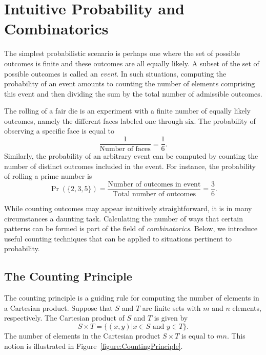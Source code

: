 \chapter{Intuitive Probability and Combinatorics}

The simplest probabilistic scenario is perhaps one where the set of possible outcomes is finite and these outcomes are all equally likely.
A subset of the set of possible outcomes is called an \emph{event}.
In such situations, computing the probability of an event amounts to counting the number of elements comprising this event and then dividing the sum by the total number of admissible outcomes.

\begin{example}
The rolling of a fair die is an experiment with a finite number of equally likely outcomes, namely the different faces labeled one through six.
The probability of observing a specific face is equal to
\begin{equation*}
\frac{1}{\text{Number of faces}} = \frac{1}{6} .
\end{equation*}
Similarly, the probability of an arbitrary event can be computed by counting the number of distinct outcomes included in the event.
For instance, the probability of rolling a prime number is
\begin{equation*}
\Pr ( \{ 2, 3, 5 \} )
= \frac{\text{Number of outcomes in event}}{\text{Total number of outcomes}}
= \frac{3}{6} .
\end{equation*}
\end{example}

While counting outcomes may appear intuitively straightforward, it is in many circumstances a daunting task.
Calculating the number of ways that certain patterns can be formed is part of the field of \emph{combinatorics}. 
Below, we introduce useful counting techniques that can be applied to situations pertinent to probability.


\section{The Counting Principle}

The counting principle is a guiding rule for computing the number of elements in a Cartesian product.
Suppose that $S$ and $T$ are finite sets with $m$ and $n$ elements, respectively.
The Cartesian product of $S$ and $T$ is given by
\begin{equation*}
S \times T = \{ (x, y) | x \in S \text{ and } y \in T \} .
\end{equation*}
The number of elements in the Cartesian product $S \times T$ is equal to $m n$.
This notion is illustrated in Figure~\ref{figure:CountingPrinciple}.

